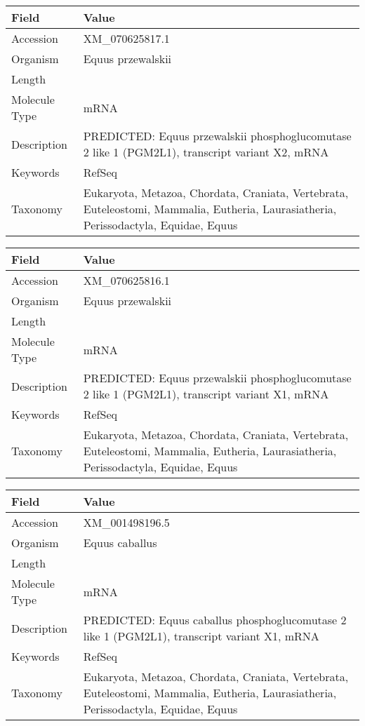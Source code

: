 \documentclass[10pt]{article}
\begin{document}
{\footnotesize
\begin{longtable}{>{\raggedright\arraybackslash}p{4.5cm} >{\raggedright\arraybackslash}p{11.5cm}}
\textbf{Field} & \textbf{Value} \\
\hline
Accession & XM\_070625817.1 \\
Organism & Equus przewalskii \\
Length & 3005 \\
Molecule Type & mRNA \\
Description & PREDICTED: Equus przewalskii phosphoglucomutase 2 like 1 (PGM2L1), transcript variant X2, mRNA \\
Keywords & RefSeq \\
Taxonomy & Eukaryota, Metazoa, Chordata, Craniata, Vertebrata, Euteleostomi, Mammalia, Eutheria, Laurasiatheria, Perissodactyla, Equidae, Equus \\
\end{longtable}
}

{\footnotesize
\begin{longtable}{>{\raggedright\arraybackslash}p{4.5cm} >{\raggedright\arraybackslash}p{11.5cm}}
\textbf{Field} & \textbf{Value} \\
\hline
Accession & XM\_070625816.1 \\
Organism & Equus przewalskii \\
Length & 4848 \\
Molecule Type & mRNA \\
Description & PREDICTED: Equus przewalskii phosphoglucomutase 2 like 1 (PGM2L1), transcript variant X1, mRNA \\
Keywords & RefSeq \\
Taxonomy & Eukaryota, Metazoa, Chordata, Craniata, Vertebrata, Euteleostomi, Mammalia, Eutheria, Laurasiatheria, Perissodactyla, Equidae, Equus \\
\end{longtable}
}

{\footnotesize
\begin{longtable}{>{\raggedright\arraybackslash}p{4.5cm} >{\raggedright\arraybackslash}p{11.5cm}}
\textbf{Field} & \textbf{Value} \\
\hline
Accession & XM\_001498196.5 \\
Organism & Equus caballus \\
Length & 4846 \\
Molecule Type & mRNA \\
Description & PREDICTED: Equus caballus phosphoglucomutase 2 like 1 (PGM2L1), transcript variant X1, mRNA \\
Keywords & RefSeq \\
Taxonomy & Eukaryota, Metazoa, Chordata, Craniata, Vertebrata, Euteleostomi, Mammalia, Eutheria, Laurasiatheria, Perissodactyla, Equidae, Equus \\
\end{longtable}
}
\end{document}
